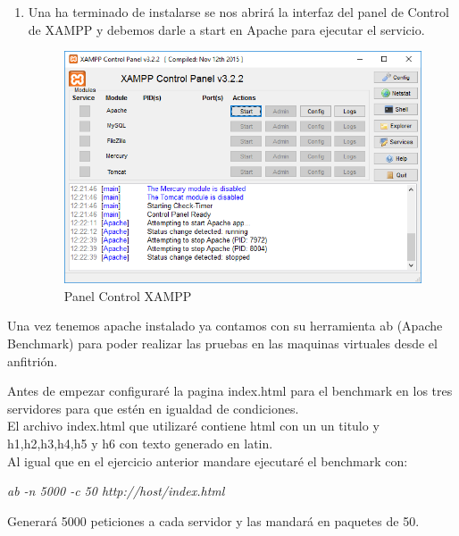 \begin{enumerate}
	\item Una ha terminado de instalarse se nos abrirá la interfaz del panel de Control de XAMPP y debemos darle a start en Apache para ejecutar el servicio.
	
	\begin{figure}[H] %
		\centering
		\includegraphics[scale=0.4]{pics/xampp7}  %
		\caption{Panel Control XAMPP} \label{fig:XAMP7}
	\end{figure}
	
\end{enumerate}

Una vez tenemos apache instalado ya contamos con su herramienta ab (Apache Benchmark) para poder realizar las pruebas en las maquinas virtuales desde el anfitrión.

Antes de empezar configuraré la pagina index.html para el benchmark en los tres servidores para que estén en igualdad de condiciones.\\
El archivo index.html que utilizaré contiene html con un un titulo y h1,h2,h3,h4,h5 y h6 con texto generado en latin.\\

Al igual que en el ejercicio anterior mandare ejecutaré el benchmark con:\\

\begin{center}
	\textit{ab -n 5000 -c 50 http://host/index.html }
\end{center}

Generará 5000 peticiones a cada servidor y las mandará en paquetes de 50.

